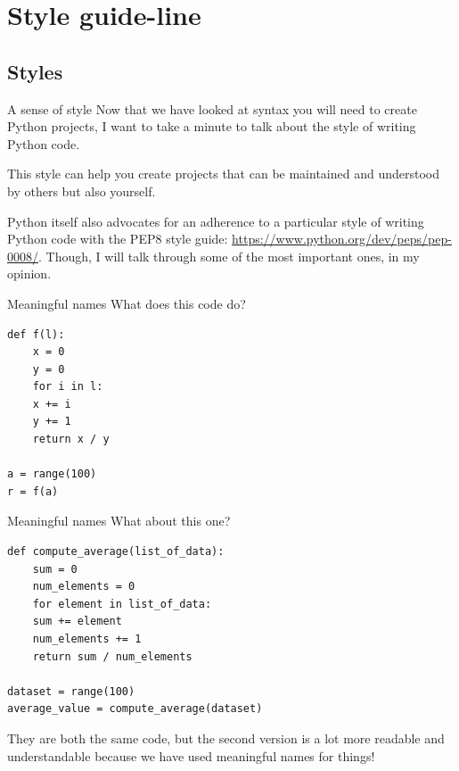 \documentclass[10pt]{beamer}
\begin{document}
\section{Style guide-line}
\label{sec:orga8d7ce5}

\subsection{Styles}
\label{sec:org56edecb}

\begin{frame}[label={sec:org3162664}]{A sense of style}
Now that we have looked at syntax you will need to create Python projects, I want to
take a minute to talk about the style of writing Python code.

This style can help you create projects that can be maintained and understood by
others but also yourself.

Python itself also advocates for an adherence to a particular style of writing Python
code with the PEP8 style guide: \url{https://www.python.org/dev/peps/pep-0008/}. Though, I
will talk through some of the most important ones, in my opinion.
\end{frame}

\begin{frame}[label={sec:orga257b19},fragile]{Meaningful names}
 What does this code do?

\begin{verbatim}
def f(l):
    x = 0
    y = 0
    for i in l:
	x += i
	y += 1
    return x / y

a = range(100)
r = f(a)
\end{verbatim}
\end{frame}

\begin{frame}[label={sec:org1c733e7},fragile]{Meaningful names}
 What about this one?

\begin{verbatim}
def compute_average(list_of_data):
    sum = 0
    num_elements = 0
    for element in list_of_data:
	sum += element
	num_elements += 1
    return sum / num_elements

dataset = range(100)
average_value = compute_average(dataset)
\end{verbatim}

They are both the same code, but the second version is a lot more readable and
understandable because we have used meaningful names for things!
\end{frame}
\end{document}
